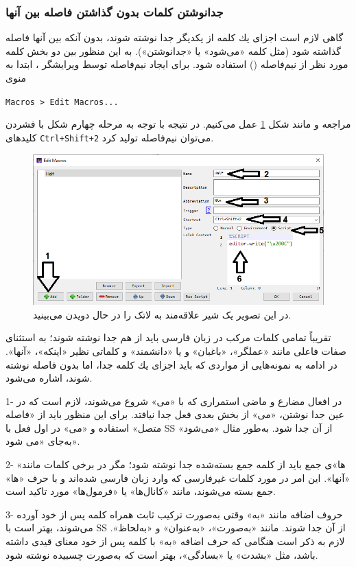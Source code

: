 \subsubsection{جدانوشتن كلمات بدون گذاشتن فاصله بین آنها}
گاهی لازم است اجزای یك كلمه از یكدیگر جدا نوشته شوند، بدون آنكه بین آنها فاصله گذاشته شود (مثل كلمه «می‌شود» یا «جدانوشتن»). به این منظور بین دو بخش كلمه مورد نظر از نیم‌فاصله
()
 استفاده شود. برای ایجاد نیم‌فاصله توسط ویرایشگر 
،
ابتدا به منوی 
\begin{latin}
\verb!Macros > Edit Macros...!	
\end{latin}
مراجعه و مانند شکل
\ref{fig:half}
عمل می‌کنیم. در نتیجه با توجه به مرحله چهارم شکل با فشردن کلیدهای
\verb!Ctrl+Shift+2!
می‌توان نیم‌فاصله تولید کرد.
\begin{figure}%
	\centerline{\includegraphics[width=15cm]{images/half}}
	\caption{در این تصویر یک شیر علاقه‌مند به لاتک را در حال دویدن می‌بینید.}
	\label{fig:half}
\end{figure}
 
تقریباً تمامی كلمات مركب در زبان فارسی باید از هم جدا نوشته شوند؛ به استثنای صفات فاعلی مانند «عملگر»، «باغبان» و یا «دانشمند» و كلماتی نظیر «اینكه»، «آنها». در ادامه به نمونه‌هایی از مواردی كه باید اجزای یك كلمه جدا، اما بدون فاصله نوشته شوند، اشاره می‌شود‌.

1-	در افعال مضارع و ماضی استمراری كه با «می» شروع می‌شوند، لازم است كه در عین جدا نوشتن، «می» از بخش بعدی فعل جدا نیافتد‌.‌ برای این منظور باید از «فاصله متصل» استفاده و «می» در اول فعل با SS از آن جدا شود.‌ به‌طور مثال «می‌شود» به‌جای «می شود». 

2-	«ها»ی جمع باید از كلمه جمع بسته‌شده جدا نوشته شود؛ مگر در برخی كلمات مانند «آنها». این امر در مورد كلمات غیر‌فارسی كه وارد زبان فارسی شده‌اند و با حرف «ها» جمع بسته می‌شوند، مانند «كانال‌ها» یا «فرمول‌ها» مورد تاكید است.

3-	حروف اضافه مانند «به» وقتی به‌صورت تركیب ثابت همراه كلمه پس از خود آورده می‌شوند، بهتر است با SS از آن جدا شوند‌.‌ مانند «به‌صورت»، «به‌عنوان» و «به‌‌‌لحاظ»‌.‌ لازم به ذكر است هنگامی كه حرف اضافه «به» با كلمه پس از خود معنای قیدی داشته باشد، مثل «بشدت» یا «بسادگی»، بهتر است كه به‌صورت چسبیده نوشته شود‌.

